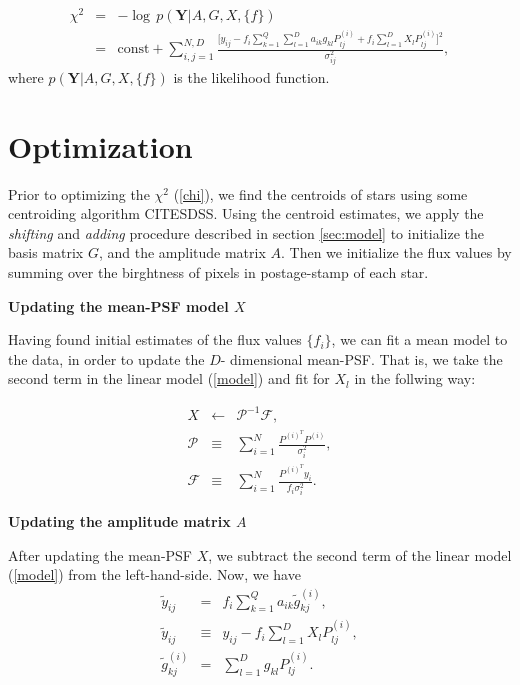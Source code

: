 \documentclass[12pt,preprint]{aastex}
\begin{document}
\begin{eqnarray}
\chi^{2} &=& - \log \, p(\mathbf{Y}|A,G,X,\{f\}) \\
         &=& \text{const} + \sum_{i,j=1}^{N,D} \frac{\Big[y_{ij} - 
             f_{i} \sum_{k=1}^{Q}\sum_{l=1}^{D} a_{ik}g_{kl}P^{(i)}_{lj} +
             f_{i}\sum_{l=1}^{D} X_{l}P^{(i)}_{lj}\Big]^{2}}{\sigma_{ij}^{2}},
\label{chi}
\end{eqnarray}
where $p(\mathbf{Y}|A,G,X,\{f\})$ is the likelihood function.


\section{Optimization}\label{sec:opt}

Prior to optimizing the $\chi^{2}$ (\ref{chi}), we find the centroids of stars
using some centroiding algorithm CITESDSS. Using the centroid estimates,
 we apply the \emph{shifting} and \emph{adding} procedure described in section \ref{sec:model}
to initialize the basis matrix $G$, and the amplitude matrix $A$. Then we initialize 
the flux values by summing over the birghtness of pixels in postage-stamp of each star.   
 
\item {\bf Updating the mean-PSF model $X$}\quad

Having found initial estimates of the flux values $\{f_{i}\}$, 
we can fit a mean model to the data, in order to update the $D$-
dimensional mean-PSF. That is, we take the second term in the 
linear model (\ref{model}) and fit for $X_{l}$ in the follwing way:

\begin{eqnarray}
X &\leftarrow& \mathcal{P}^{-1}\mathcal{F}, \\
\mathcal{P} &\equiv& \sum_{i=1}^{N} \frac{P^{(i)}^{T}P^{(i)}}{\sigma_{i}^{2}}, \\
\mathcal{F} &\equiv& \sum_{i=1}^{N} \frac{P^{(i)}^{T}y_{i}}{f_{i}\sigma_{i}^{2}}.
\end{eqnarray}

\item {\bf Updating the amplitude matrix $A$}\quad

After updating the mean-PSF $X$, we subtract the second term of the
linear model (\ref{model}) from the left-hand-side. Now, we have
\begin{eqnarray}
\tilde{y}_{ij} &=& f_{i}\sum_{k=1}^{Q}a_{ik}\tilde{g}^{(i)}_{kj}, \label{tildey} \\
\tilde{y}_{ij} &\equiv& y_{ij} - f_{i}\sum_{l=1}^{D} X_{l}P^{(i)}_{lj}, \\
\tilde{g}^{(i)}_{kj} &=& \sum_{l=1}^{D} g_{kl}P^{(i)}_{lj}.
\end{eqnarray}
\end{document}
